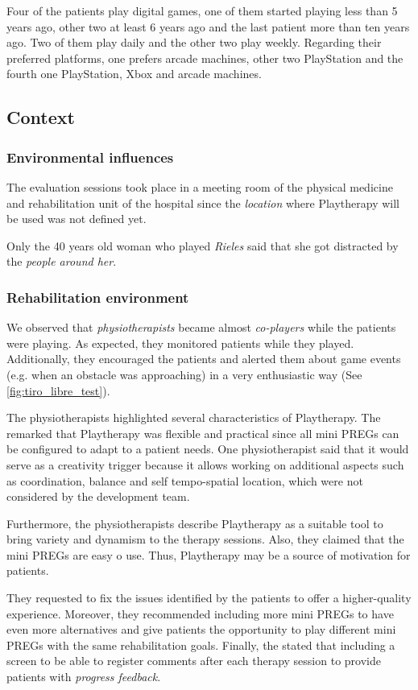 Four of the patients play digital games, one of them started playing less than 5 years ago, other two at least 6 years ago and the last patient more than ten years ago. Two of them play daily and the other two play weekly. Regarding their preferred platforms, one prefers arcade machines, other two PlayStation and the fourth one PlayStation, Xbox and arcade machines.

\subsection{Context}

\subsubsection{Environmental influences}
The evaluation sessions took place in a meeting room of the physical medicine and rehabilitation unit of the hospital since the \textit{location} where Playtherapy will be used was not defined yet.

Only the 40 years old woman who played \textit{Rieles} said that she got distracted by the \textit{people around her}.

\subsubsection{Rehabilitation environment}
We observed that \textit{physiotherapists} became almost \textit{co-players} while the patients were playing. As expected, they monitored patients while they played. Additionally, they encouraged the patients and alerted them about game events (e.g. when an obstacle was approaching) in a very enthusiastic way (See \autoref{fig:tiro_libre_test}).

The physiotherapists highlighted several characteristics of Playtherapy. The remarked that Playtherapy was flexible and practical since all mini \acp{PREG} can be configured to adapt to a patient needs. One physiotherapist said that it would serve as a creativity trigger because it allows working on additional aspects such as coordination, balance and self tempo-spatial location, which were not considered by the development team.

Furthermore, the physiotherapists describe Playtherapy as a suitable tool to bring variety and dynamism to the therapy sessions. Also, they claimed that the mini \acp{PREG} are easy o use. Thus, Playtherapy may be a source of motivation for patients.

They requested to fix the issues identified by the patients to offer a higher-quality experience. Moreover, they recommended including more mini \acp{PREG} to have even more alternatives and give patients the opportunity to play different mini \acp{PREG} with the same rehabilitation goals. Finally, the stated that including a screen to be able to register comments after each therapy session to provide patients with \textit{progress feedback}.

